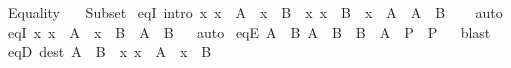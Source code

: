 %
\begin{isabellebody}%
%
%
\isadelimdocument
%
\endisadelimdocument
%
\isatagdocument
%
\isamarkuptrue%
%
\endisatagdocument
{\isafolddocument}%
%
\isadelimdocument
%
\endisadelimdocument
%
\isadelimtheory
%
\endisadelimtheory
%
\isatagtheory
{}\isamarkupfalse%
\ Equality\isanewline
\ \ \ Subset\isanewline
{}%
\endisatagtheory
{\isafoldtheory}%
%
\isadelimtheory
\isanewline
%
\endisadelimtheory
\isanewline
{}\isamarkupfalse%
\ eqI\ {\isacharbrackleft}{\kern0pt}intro{\isacharbrackright}{\kern0pt}{\isacharcolon}{\kern0pt}\ {\isachardoublequoteopen}{\isacharparenleft}{\kern0pt}{\isasymAnd}x{\isachardot}{\kern0pt}\ x\ {\isasymin}\ A\ {\isasymLongrightarrow}\ x\ {\isasymin}\ B{\isacharparenright}{\kern0pt}\ {\isasymLongrightarrow}\ {\isacharparenleft}{\kern0pt}{\isasymAnd}x{\isachardot}{\kern0pt}\ x\ {\isasymin}\ B\ {\isasymLongrightarrow}\ x\ {\isasymin}\ A{\isacharparenright}{\kern0pt}\ {\isasymLongrightarrow}\ A\ {\isacharequal}{\kern0pt}\ B{\isachardoublequoteclose}\isanewline
%
\isadelimproof
\ \ %
\endisadelimproof
%
\isatagproof
{}\isamarkupfalse%
\ auto%
\endisatagproof
{\isafoldproof}%
%
\isadelimproof
\isanewline
%
\endisadelimproof
\isanewline
{}\isamarkupfalse%
\ eqI{\isacharprime}{\kern0pt}{\isacharcolon}{\kern0pt}\ {\isachardoublequoteopen}{\isacharparenleft}{\kern0pt}{\isasymAnd}x{\isachardot}{\kern0pt}\ x\ {\isasymin}\ A\ {\isasymlongleftrightarrow}\ x\ {\isasymin}\ B{\isacharparenright}{\kern0pt}\ {\isasymLongrightarrow}\ A\ {\isacharequal}{\kern0pt}\ B{\isachardoublequoteclose}%
\isadelimproof
\ %
\endisadelimproof
%
\isatagproof
{}\isamarkupfalse%
\ auto%
\endisatagproof
{\isafoldproof}%
%
\isadelimproof
%
\endisadelimproof
\isanewline
\isanewline
{}\isamarkupfalse%
\ eqE{\isacharcolon}{\kern0pt}\ {\isachardoublequoteopen}{\isasymlbrakk}A\ {\isacharequal}{\kern0pt}\ B{\isacharsemicolon}{\kern0pt}\ {\isasymlbrakk}A\ {\isasymsubseteq}\ B\ {\isacharsemicolon}{\kern0pt}\ B\ {\isasymsubseteq}\ A{\isasymrbrakk}\ {\isasymLongrightarrow}\ P{\isasymrbrakk}\ {\isasymLongrightarrow}\ P{\isachardoublequoteclose}%
\isadelimproof
\ %
\endisadelimproof
%
\isatagproof
{}\isamarkupfalse%
\ blast%
\endisatagproof
{\isafoldproof}%
%
\isadelimproof
%
\endisadelimproof
\isanewline
\isanewline
{}\isamarkupfalse%
\ eqD\ {\isacharbrackleft}{\kern0pt}dest{\isacharbrackright}{\kern0pt}{\isacharcolon}{\kern0pt}\ {\isachardoublequoteopen}A\ {\isacharequal}{\kern0pt}\ B\ {\isasymLongrightarrow}\ {\isacharparenleft}{\kern0pt}{\isasymAnd}x{\isachardot}{\kern0pt}\ x\ {\isasymin}\ A\ {\isasymlongleftrightarrow}\ x\ {\isasymin}\ B{\isacharparenright}{\kern0pt}{\isachardoublequoteclose}%

\end{isabellebody}
